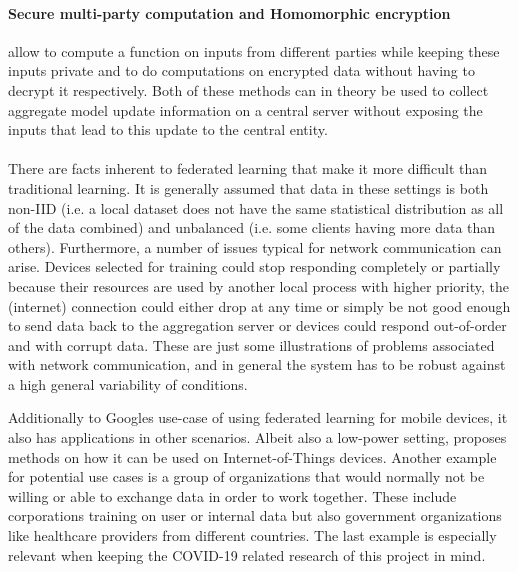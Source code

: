 \paragraph{Secure multi-party computation and Homomorphic encryption} allow to compute a function on inputs from different parties while keeping these inputs private\cite{wiki_smpc} and to do computations on encrypted data without having to decrypt it\cite{wiki_he} respectively. Both of these methods can in theory be used to collect aggregate model update information on a central server without exposing the inputs that lead to this update to the central entity. 
\\\\
There are facts inherent to federated learning that make it more difficult than traditional learning.
It is generally assumed that data in these settings is both non-IID (i.e. a local dataset does not have the same statistical distribution as all of the data combined) and unbalanced (i.e. some clients having more data than others). 
Furthermore, a number of issues typical for network communication can arise. Devices selected for training could stop responding completely or partially because their resources are used by another local process with higher priority, the (internet) connection could either drop at any time or simply be not good enough to send data back to the aggregation server or devices could respond out-of-order and with corrupt data. These are just some illustrations of problems associated with network communication, and in general the system has to be robust against a high general variability of conditions.

Additionally to Googles use-case of using federated learning for mobile devices, it also has applications in other scenarios. Albeit also a low-power setting, \cite{iot_fl} proposes methods on how it can be used on Internet-of-Things devices. Another example for potential use cases is a group of organizations that would normally not be willing or able to exchange data in order to work together. These include corporations training on user or internal data but also government organizations like healthcare providers from different countries. The last example is especially relevant when keeping the COVID-19 related research of this project in mind. 

